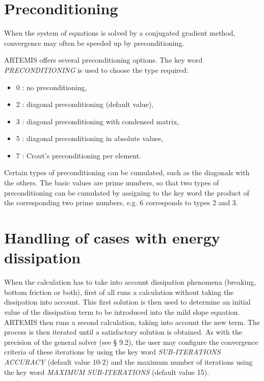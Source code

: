 \section{Preconditioning}

When the system of equations is solved by a conjugated gradient method,
convergence may often be speeded up by preconditioning.

ARTEMIS offers several preconditioning options. The key word
\textit{PRECONDITIONING} is used to choose the type required:

\begin{itemize}
\item  0 : no preconditioning,

\item  2 : diagonal preconditioning (default value),

\item  3 : diagonal preconditioning with condensed matrix,

\item  5 : diagonal preconditioning in absolute values,

\item  7 : Crout's preconditioning per element.
\end{itemize}

Certain types of preconditioning can be cumulated, such as the diagonals with
the others. The basic values are prime numbers, so that two types of
preconditioning can be cumulated by assigning to the key word the product of
the corresponding two prime numbers, e.g. 6 corresponds to types 2 and 3.


\section{Handling of cases with energy dissipation}

When the calculation has to take into account dissipation phenomena (breaking,
bottom friction or both), \artemis{} first of all runs a calculation without
taking the dissipation into account. This first solution is then used to
determine an initial value of the dissipation term to be introduced into the
mild slope equation. ARTEMIS then runs a second calculation, taking into
account the new term. The process is then iterated until a satisfactory
solution is obtained. As with the precision of the general solver (see {\S}
9.2), the user may configure the convergence criteria of these iterations by
using the key word \textit{SUB-ITERATIONS ACCURACY} (default value 10-2) and
the maximum number of iterations using the key word \textit{MAXIMUM
SUB-ITERATIONS} (default value 15).

